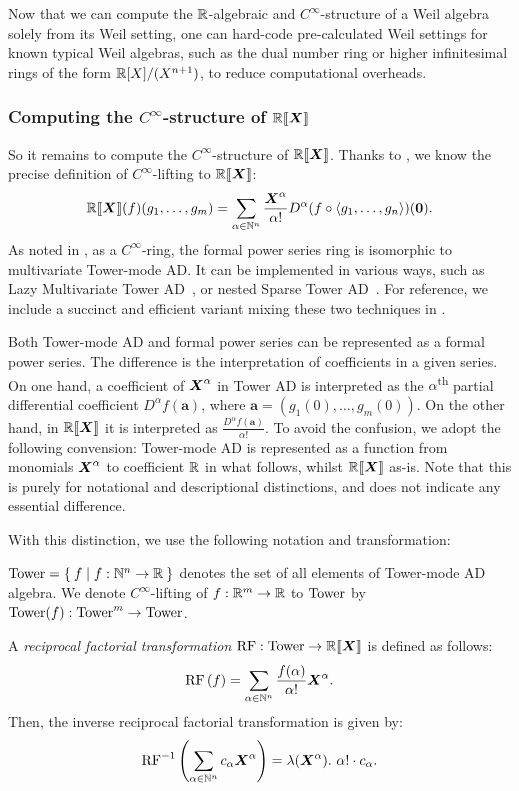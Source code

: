 Now that we can compute the $\mathbb{R}$-algebraic and $C^\infty$-structure of a Weil algebra solely from its Weil setting, one can hard-code pre-calculated Weil settings for known typical Weil algebras, such as the dual number ring or higher infinitesimal rings of the form $\mathbb{R}[X]/(X^{n+1})$, to reduce computational overheads.

\subsubsection{Computing the $C^\infty$-structure of $\mathord{\mathbb{R}\llbracket\boldsymbol{X}\rrbracket}$}\label{sec:power-series-lifting}
So it remains to compute the $C^\infty$-structure of $\mathord{\mathbb{R}\llbracket\boldsymbol{X}\rrbracket}$.
Thanks to , we know the precise definition of $C^\infty$-lifting to $\mathord{\mathbb{R}\llbracket\boldsymbol{X}\rrbracket}$:
\[
  \mathord{\mathbb{R}\llbracket\boldsymbol{X}\rrbracket}(f)(g_1, \dots, g_m) = \sum_{\alpha \in \mathbb{N}^n} \frac{\boldsymbol{X}^\alpha}{\alpha!} D^\alpha(f \circ \braket{g_1, \dots, g_n})(\boldsymbol{0}).
\]
As noted in , as a $C^\infty$-ring, the formal power series ring is isomorphic to multivariate Tower-mode AD.
It can be implemented in various ways, such as Lazy Multivariate Tower AD~\cite{Pearlmutter:2007aa}, or nested Sparse Tower AD~\cite[{module \texttt{Numeric.AD.Rank1.Sparse}}]{Kmett:2010aa}.
For reference, we include a succinct and efficient variant mixing these two techniques in .

Both Tower-mode AD and formal power series can be represented as a formal power series.
The difference is the interpretation of coefficients in a given series.
On one hand, a coefficient of $\boldsymbol{X}^\alpha$ in Tower AD is interpreted as the $\alpha$\textsuperscript{th} partial differential coefficient $D^\alpha f(\boldsymbol{a})$, where $\boldsymbol{a} = (g_1(0), \dots, g_m(0))$.
On the other hand, in $\mathord{\mathbb{R}\llbracket\boldsymbol{X}\rrbracket}$ it is interpreted as $\frac{D^\alpha f(\boldsymbol{a})}{\alpha!}$.
To avoid the confusion, we adopt the following convension: Tower-mode AD is represented as a function from monomials $\boldsymbol{X}^\alpha$ to coefficient $\mathbb{R}$ in what follows, whilst $\mathord{\mathbb{R}\llbracket\boldsymbol{X}\rrbracket}$ as-is.
Note that this is purely for notational and descriptional distinctions, and does not indicate any essential difference.

With this distinction, we use the following notation and transformation:

\begin{definition}
  $\mathord{\mathrm{Tower}} = \Set{f | f: \mathbb{N}^n \to \mathbb{R}}$ denotes the set of all elements of Tower-mode AD algebra.
  We denote $C^\infty$-lifting of $f: \mathbb{R}^m \to \mathbb{R}$ to $\mathord{\mathrm{Tower}}$ by $\mathord{\mathrm{Tower}}(f): \mathord{\mathrm{Tower}}^m \to \mathord{\mathrm{Tower}}$.

  A \emph{reciprocal factorial transformation} $\operatorname{RF}: \mathord{\mathrm{Tower}} \to \mathord{\mathbb{R}\llbracket\boldsymbol{X}\rrbracket}$ is defined as follows:
  \[
    \operatorname{RF}\left(f\right)
    = \sum_{\alpha \in \mathbb{N}^n} \frac{f(\alpha)}{\alpha!} \boldsymbol{X}^\alpha.
  \]
  Then, the inverse reciprocal factorial transformation is given by:
  \[
  \operatorname{RF}^{-1}\left(\sum_{\alpha \in \mathbb{N}^n} c_\alpha \boldsymbol{X}^\alpha\right)
  = \lambda (\boldsymbol{X}^\alpha).\ \alpha ! \cdot c_\alpha.
  \]
\end{definition}

